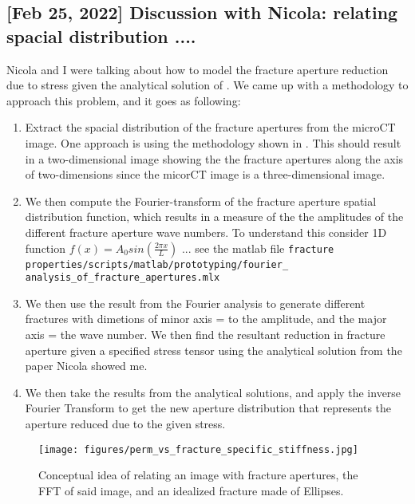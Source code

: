\documentclass[12pt,titlepage]{article}
\begin{document}
\subsection{[Feb 25, 2022] Discussion with Nicola: relating spacial distribution .... }
Nicola and I were talking about how to model the fracture aperture reduction due to stress given the analytical solution of . We came up with a methodology to approach this problem, and it goes as following:
\begin{enumerate}
\item Extract the spacial distribution of the fracture apertures from the microCT image. One approach is using the methodology shown in \citep[see][fig. 5]{Zhao2018}. This should result in a two-dimensional image showing the the fracture apertures along the axis of two-dimensions since the micorCT image is a three-dimensional image.

\item We then compute the Fourier-transform of the fracture aperture spatial distribution function, which results in a measure of the the amplitudes of the different fracture aperture wave numbers. To understand this consider 1D function $f(x) = A_0 sin(\frac{2\pi x}{L})$ ... see the matlab file \texttt{fracture properties/scripts/matlab/prototyping/fourier\_ analysis\_of\_fracture\_apertures.mlx}

\item We then use the result from the Fourier analysis to generate different fractures with dimetions of minor axis = to the amplitude, and the major axis = the wave number. We then find the resultant reduction in fracture aperture given a specified stress tensor using the analytical solution from the paper Nicola showed me.

\item We then take the results from the analytical solutions, and apply the inverse Fourier Transform to get the new aperture distribution that represents the aperture reduced due to the given stress. 
\end{enumerate}

\begin{figure}[!ht]
\centering
\texttt{[image: figures/perm\_vs\_fracture\_specific\_stiffness.jpg]}
\caption{Conceptual idea of relating an image with fracture apertures, the FFT of said image, and an idealized fracture made of Ellipses.}
\label{fig:concept}
\end{figure}
\end{document}
